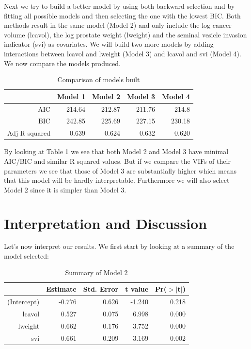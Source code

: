 \documentclass[10pt]{article}
\begin{document}
Next we try to build a better model by using both backward selection and by fitting all possible models and then selecting the one with the lowest BIC. Both methods result in the same model (Model 2) and only include the log cancer volume (lcavol), the log prostate weight (lweight) and the seminal vesicle invasion indicator (svi) as covariates. We will build two more models by adding interactions  between lcavol and lweight (Model 3) and lcavol and svi (Model 4). We now compare the models produced.

\begin{table}[ht]
\centering
\caption{Comparison of models built} \label{criteriontable}
\begin{tabular}{rrrrr}
  \hline
 & Model 1 & Model 2 & Model 3 & Model 4 \\ 
  \hline
AIC & 214.64 & 212.87 & 211.76 & 214.8 \\ 
BIC & 242.85 & 225.69 & 227.15 & 230.18 \\ 
Adj R squared & 0.639 & 0.624 & 0.632 & 0.620 \\ 
  \hline
\end{tabular}
\end{table}

By looking at Table 1 we see that both Model 2 and Model 3 have minimal AIC/BIC and similar R squared values. But if we compare the VIFs of their parameters we see that those of Model 3 are substantially higher which means that this model will be hardly interpretable. Furthermore we will also select Model 2 since it is simpler than Model 3.

\section{Interpretation and Discussion}

\quad Let's now interpret our results. We first start by looking at a summary of the model selected:

\begin{table}[ht]
\centering
\caption{Summary of Model 2} \label{summary}
\begin{tabular}{rrrrr}
  \hline
 & Estimate & Std. Error & t value & Pr($>$$|$t$|$) \\ 
  \hline
(Intercept) & -0.776 & 0.626 & -1.240 & 0.218 \\ 
  lcavol & 0.527 & 0.075 & 6.998 & 0.000 \\ 
  lweight & 0.662 & 0.176 & 3.752 & 0.000 \\ 
  svi & 0.661 & 0.209 & 3.169 & 0.002 \\ 
   \hline
\end{tabular}
\end{table}
\end{document}
